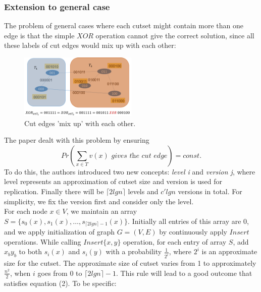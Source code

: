 \documentclass[conference,compsoc]{IEEEtran}
\begin{document}
\subsubsection*{Extension to general case} 
The problem of general cases where each cutset might contain more than one edge is that the simple $XOR$ operation cannot give the correct solution, since all these labels of cut edges would mix up with each other:
\begin{figure}[H]
	\centering
	\includegraphics[width=0.5\textwidth]{Pic/6.png}
	\caption{Cut edges 'mix up' with each other.}
	\label{fig:6}
\end{figure}
The paper dealt with this problem by ensuring 
\begin{equation}
Pr(\sum_{x\in T} v(x)\textit{ gives the cut edge})=const. 
\end{equation} 
To do this, the authors introduced two new concepts: \textit{level i} and \textit{version j}, where level represents an approximation of cutset size and version is used for replication. Finally there will be $\lceil 2lgn \rceil$ levels and $c'lgn$ versions in total. For simplicity, we fix the version first and consider only the level.\\
For each node $x\in V$, we maintain an array $S=\{s_0(x),s_1(x),\dots,s_{\lceil 2lgn \rceil-1}(x)\}$. Initially all entries of this array are 0, and we apply initialization of graph $G=(V,E)$ by continuously apply $Insert$ operations. While calling $Insert\{x,y\}$ operation, for each entry of array $S$, add $x_by_b$ to both $s_i(x)$ and $s_i(y)$ with a probability $\frac{1}{2^i}$, where $2^i$ is an approximate size for the cutset. The approximate size of cutset varies from 1 to approximately $\frac{n^2}{2}$, when $i$ goes from $0$ to $\lceil 2lgn \rceil-1$. This rule will lead to a good outcome that satisfies equation (2). To be specific:
\end{document}
